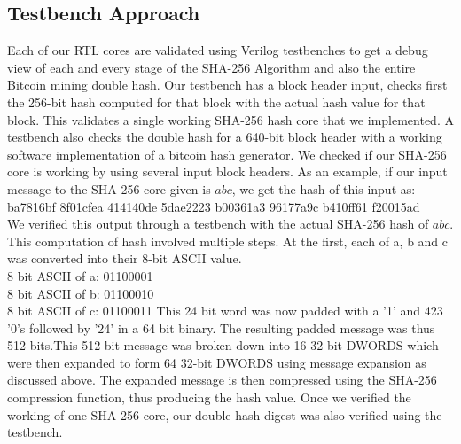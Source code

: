 \subsection{Testbench Approach}
Each of our RTL cores are validated using Verilog testbenches to get a debug view of each and every stage of the SHA-256 Algorithm and also the entire Bitcoin mining double hash. Our testbench has a block header input, checks first the 256-bit hash computed for that block with the actual hash value for that block. This validates a single working SHA-256 hash core that we implemented. A testbench also checks the double hash for a 640-bit block header with a working software implementation of a bitcoin hash generator.
We checked if our SHA-256 core is working by using several input block headers. As an example, if our input message to the SHA-256 core given is $abc$, we get the hash of this input as: \\ba7816bf 8f01cfea 414140de 5dae2223 b00361a3 96177a9c b410ff61 f20015ad
\\We verified this output through a testbench with the actual SHA-256 hash of $abc$.
This computation of hash involved multiple steps. At the first, each of a, b and c was converted into their 8-bit ASCII value.
\\8 bit ASCII of a: 01100001
\\8 bit ASCII of b: 01100010
\\8 bit ASCII of c: 01100011
This 24 bit word was now padded with a '1' and 423 '0's followed by '24' in a 64 bit binary. The resulting padded message was thus 512 bits.This 512-bit message was broken down into 16 32-bit DWORDS which were then expanded to form 64 32-bit DWORDS using message expansion as discussed above. The expanded message is then compressed using the SHA-256 compression function, thus producing the hash value.
Once we verified the working of one SHA-256 core, our double hash digest was also verified using the testbench.
